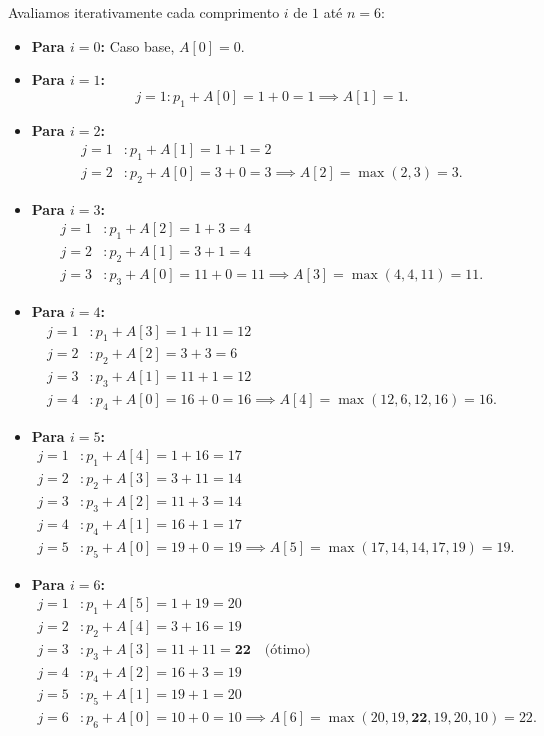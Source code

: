 \documentclass[11pt,a4paper]{article}
\begin{document}
Avaliamos iterativamente cada comprimento $i$ de $1$ até $n = 6$:

\begin{itemize}
    \item \textbf{Para $i = 0$:} Caso base, $A[0] = 0$.
    \item \textbf{Para $i = 1$:}
    \[
    j = 1: p_1 + A[0] = 1 + 0 = 1 \implies A[1] = 1.
    \]
    \item \textbf{Para $i = 2$:}
    \begin{align*}
    j = 1 &: p_1 + A[1] = 1 + 1 = 2 \\
    j = 2 &: p_2 + A[0] = 3 + 0 = 3 \implies A[2] = \max(2, 3) = 3.
    \end{align*}
    \item \textbf{Para $i = 3$:}
    \begin{align*}
    j = 1 &: p_1 + A[2] = 1 + 3 = 4 \\
    j = 2 &: p_2 + A[1] = 3 + 1 = 4 \\
    j = 3 &: p_3 + A[0] = 11 + 0 = 11 \implies A[3] = \max(4, 4, 11) = 11.
    \end{align*}
    \item \textbf{Para $i = 4$:}
    \begin{align*}
    j = 1 &: p_1 + A[3] = 1 + 11 = 12 \\
    j = 2 &: p_2 + A[2] = 3 + 3 = 6 \\
    j = 3 &: p_3 + A[1] = 11 + 1 = 12 \\
    j = 4 &: p_4 + A[0] = 16 + 0 = 16 \implies A[4] = \max(12, 6, 12, 16) = 16.
    \end{align*}
    \item \textbf{Para $i = 5$:}
    \begin{align*}
    j = 1 &: p_1 + A[4] = 1 + 16 = 17 \\
    j = 2 &: p_2 + A[3] = 3 + 11 = 14 \\
    j = 3 &: p_3 + A[2] = 11 + 3 = 14 \\
    j = 4 &: p_4 + A[1] = 16 + 1 = 17 \\
    j = 5 &: p_5 + A[0] = 19 + 0 = 19 \implies A[5] = \max(17, 14, 14, 17, 19) = 19.
    \end{align*}
    \item \textbf{Para $i = 6$:}
    \begin{align*}
    j = 1 &: p_1 + A[5] = 1 + 19 = 20 \\
    j = 2 &: p_2 + A[4] = 3 + 16 = 19 \\
    j = 3 &: p_3 + A[3] = 11 + 11 = \mathbf{22} \quad \text{(ótimo)} \\
    j = 4 &: p_4 + A[2] = 16 + 3 = 19 \\
    j = 5 &: p_5 + A[1] = 19 + 1 = 20 \\
    j = 6 &: p_6 + A[0] = 10 + 0 = 10 \implies A[6] = \max(20, 19, \mathbf{22}, 19, 20, 10) = 22.
    \end{align*}
\end{itemize}
\end{document}
